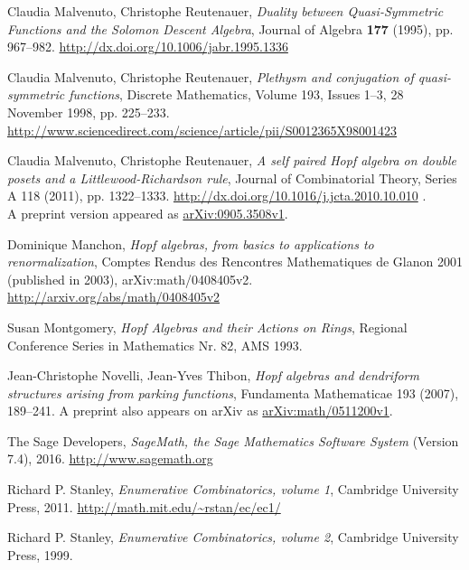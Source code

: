 \documentclass[12pt]{article}
\theoremstyle{plain}
\theoremstyle{definition}
\theoremstyle{remark}
\begin{document}
\begin{thebibliography}{10}
Claudia Malvenuto, Christophe Reutenauer,
\textit{Duality between Quasi-Symmetric Functions and the Solomon
Descent Algebra},
Journal of Algebra \textbf{177} (1995), pp. 967--982.
\newline\url{http://dx.doi.org/10.1006/jabr.1995.1336}

Claudia Malvenuto, Christophe Reutenauer,
\textit{Plethysm and conjugation of quasi-symmetric functions}, Discrete
Mathematics, Volume 193, Issues 1--3, 28 November 1998, pp.
225--233.\newline
\url{http://www.sciencedirect.com/science/article/pii/S0012365X98001423}

Claudia Malvenuto, Christophe Reutenauer,
\textit{A self paired Hopf algebra on double posets and
a Littlewood-Richardson rule},
Journal of Combinatorial Theory, Series A 118 (2011), pp. 1322--1333.
\newline
\url{http://dx.doi.org/10.1016/j.jcta.2010.10.010} . \\
A preprint version appeared as
\href{http://arxiv.org/abs/0905.3508v1}{arXiv:0905.3508v1}.

Dominique Manchon, \textit{Hopf algebras, from
basics to applications to renormalization}, Comptes Rendus des Rencontres
Mathematiques de Glanon 2001 (published in 2003), arXiv:math/0408405v2.\newline%
\url{http://arxiv.org/abs/math/0408405v2}

Susan Montgomery, \textit{Hopf Algebras and their
Actions on Rings}, Regional Conference Series in Mathematics Nr. 82, AMS 1993.

 Jean-Christophe Novelli, Jean-Yves Thibon,
\textit{Hopf algebras and dendriform structures arising from parking functions},
Fundamenta Mathematicae 193 (2007), 189--241. A preprint also appears
on arXiv as \href{http://arxiv.org/abs/math/0511200v1}{arXiv:math/0511200v1}.

The Sage Developers, \textit{SageMath,
the Sage Mathematics Software System} (Version 7.4), 2016.
\url{http://www.sagemath.org}

Richard P. Stanley, \textit{Enumerative
Combinatorics, volume 1}, Cambridge University Press, 2011. \newline%
\url{http://math.mit.edu/~rstan/ec/ec1/}

Richard P. Stanley, \textit{Enumerative
Combinatorics, volume 2}, Cambridge University Press, 1999.


\end{thebibliography}
\end{document}
